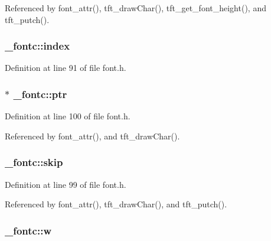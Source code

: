 Referenced by font\-\_\-attr(), tft\-\_\-draw\-Char(), tft\-\_\-get\-\_\-font\-\_\-height(), and tft\-\_\-putch().

\hypertarget{struct__fontc_a7cc0370744ff7ea964054d36917c9a2f}{
\subsubsection[{index}]{ \-\_\-fontc\-::index}}\label{struct__fontc_a7cc0370744ff7ea964054d36917c9a2f}


Definition at line 91 of file font.\-h.

\hypertarget{struct__fontc_a60a3fef5ccd80dff543aac3f22f74876}{
\subsubsection[{ptr}]{ $\ast$ \-\_\-fontc\-::ptr}}\label{struct__fontc_a60a3fef5ccd80dff543aac3f22f74876}


Definition at line 100 of file font.\-h.



Referenced by font\-\_\-attr(), and tft\-\_\-draw\-Char().

\hypertarget{struct__fontc_a44c94e91afa006cb2ffe55a99b3e2d3c}{
\subsubsection[{skip}]{ \-\_\-fontc\-::skip}}\label{struct__fontc_a44c94e91afa006cb2ffe55a99b3e2d3c}


Definition at line 99 of file font.\-h.



Referenced by font\-\_\-attr(), tft\-\_\-draw\-Char(), and tft\-\_\-putch().

\hypertarget{struct__fontc_a9c2af0354d2b2009e7b6684e25fd479b}{
\subsubsection[{w}]{ \-\_\-fontc\-::w}}\label{struct__fontc_a9c2af0354d2b2009e7b6684e25fd479b}


